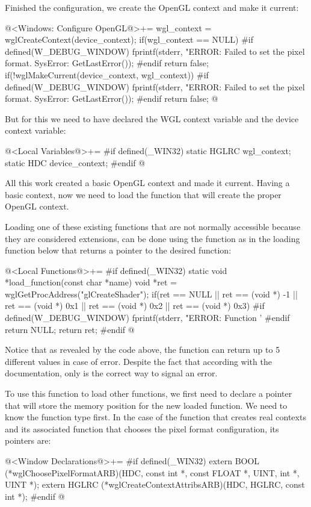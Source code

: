 Finished the configuration, we create the OpenGL context and make it
current:

\iniciocodigo
@<Windows: Configure OpenGL@>+=
wgl_context = wglCreateContext(device_context);
if(wgl_context == NULL){
#if defined(W_DEBUG_WINDOW)
  fprintf(stderr, "ERROR: Failed to set the pixel format. SysError: %
          GetLastError());
#endif
  return false;
}
if(!wglMakeCurrent(device_context, wgl_context)){
#if defined(W_DEBUG_WINDOW)
  fprintf(stderr, "ERROR: Failed to set the pixel format. SysError: %
          GetLastError());
#endif
  return false;
}
@
\fimcodigo

But for this we need to have declared the WGL context variable and the
device context variable:

@<Local Variables@>+=
#if defined(_WIN32)
static HGLRC wgl_context;
static HDC device_context;
#endif
@
\fimcodigo

All this work created a basic OpenGL context and made it
current. Having a basic context, now we need to load the function that
will create the proper OpenGL context.

Loading one of these existing functions that are not normally
accessible because they are considered extensions, can be done using
the function  as in the loading function
below that returns a pointer to the desired function:

\iniciocodigo
@<Local Functions@>+=
#if defined(_WIN32)
static void *load_function(const char *name){
  void *ret = wglGetProcAddress("glCreateShader");
  if(ret == NULL || ret == (void *) -1 || ret == (void *) 0x1 ||
     ret == (void *) 0x2 || ret == (void *) 0x3){
#if defined(W_DEBUG_WINDOW)
    fprintf(stderr, "ERROR: Function '%
#endif
    return NULL;
  }
  return ret;
}
#endif
@
\fimcodigo

Notice that as revealed by the code above, the
function  can return up to 5 different
values in case of error. Despite the fact that according with the
documentation, only  is the correct way to signal an
error.

To use this function to load other functions, we first need to declare
a pointer that will store the memory position for the new loaded
function. We need to know the function type first. In the case of the
function that creates real contexts and its associated function that
chooses the pixel format configuration, its pointers are:

\iniciocodigo
@<Window Declarations@>+=
#if defined(_WIN32)
extern BOOL (*wglChoosePixelFormatARB)(HDC, const int *, const FLOAT *, UINT,
                                       int *, UINT *);
extern HGLRC (*wglCreateContextAttribsARB)(HDC, HGLRC, const int *);
#endif
@
\fimcodigo

